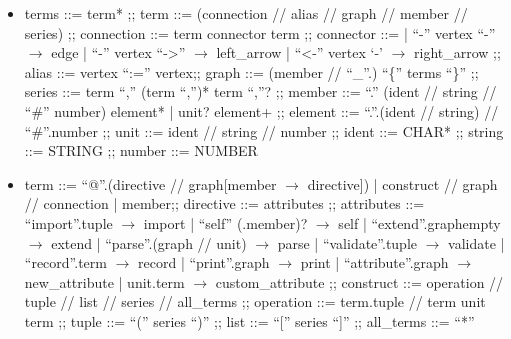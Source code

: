 \begin{itemize}


\begin{itemize}
\item \begin{bnf}
  terms ::= term* ;;
  term ::= (connection // alias // graph // member // series) ;;
  connection ::= term connector term ;;
	connector ::=
   | ``-'' vertex ``-'' $\to$ edge
   | ``-'' vertex ``->'' $\to$ left\_arrow
	 | ``<-'' vertex `-' $\to$ right\_arrow ;;
  alias ::= vertex ``:='' vertex;;
  graph ::= (member // ``\_''.) ``\{'' terms ``\}'' ;;
  series ::= term ``,'' (term ``,'')* term ``,''? ;;
  member ::= ``.'' (ident // string // ``\#'' number) element*
  | unit? element+ ;;
  element ::= ``.''.(ident // string) // ``\#''.number ;;
	unit ::= ident // string // number ;;
  ident ::= CHAR* ;;
	string ::= STRING ;;
	number ::= NUMBER
 \end{bnf}

\item \begin{bnf}
  term ::= ``@''.(directive // graph[member $\to$ directive]) | construct // graph // connection | member;;
  directive ::= attributes ;;
  attributes ::= ``import''.tuple $\to$ import
  | ``self'' (.member)? $\to$ self
  | ``extend''.graph{empty} $\to$ extend
  | ``parse''.(graph // unit) $\to$ parse
  | ``validate''.tuple $\to$ validate
  | ``record''.term $\to$ record
  | ``print''.graph $\to$ print
  | ``attribute''.graph $\to$ new\_attribute
  | unit.term $\to$ custom\_attribute ;;
  construct ::= operation // tuple // list // series // all\_terms ;;
  operation ::= term.tuple // term unit term ;;
  tuple ::= ``('' series ``)'' ;;
  list ::= ``['' series ``]'' ;;
  all\_terms ::= ``*''
\end{bnf}


\end{itemize}
\end{itemize}
